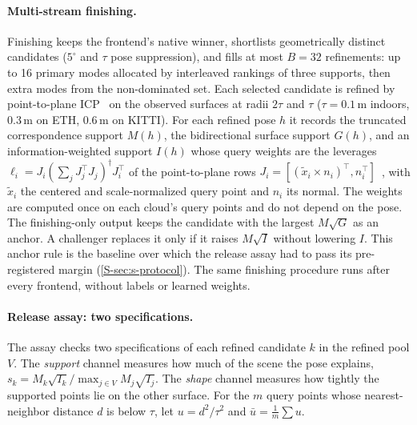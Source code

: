 \paragraph{Multi-stream finishing.} Finishing keeps the frontend's native winner, shortlists geometrically distinct candidates ($5^\circ$ and $\tau$ pose suppression), and fills at most $B=32$ refinements: up to 16 primary modes allocated by interleaved rankings of three supports, then extra modes from the non-dominated set. Each selected candidate is refined by point-to-plane ICP~\cite{besl1992icp,chen1992medioni} on the observed surfaces at radii $2\tau$ and $\tau$ ($\tau=0.1$\,m indoors, 0.3\,m on ETH, 0.6\,m on KITTI). For each refined pose $h$ it records the truncated correspondence support $M(h)$, the bidirectional surface support $G(h)$, and an information-weighted support $I(h)$ whose query weights are the leverages $\ell_i=J_i(\sum_jJ_j^\top J_j)^{\dagger}J_i^\top$ of the point-to-plane rows $J_i=[(\widetilde x_i\times n_i)^\top,n_i^\top]$~\cite{gelfand2003stable}, with $\widetilde x_i$ the centered and scale-normalized query point and $n_i$ its normal. The weights are computed once on each cloud's query points and do not depend on the pose. The finishing-only output keeps the candidate with the largest $M\sqrt{G}$ as an anchor. A challenger replaces it only if it raises $M\sqrt{I}$ without lowering $I$. This anchor rule is the baseline over which the release assay had to pass its pre-registered margin (\cref{S-sec:s-protocol}). The same finishing procedure runs after every frontend, without labels or learned weights.

\paragraph{Release assay: two specifications.} The assay checks two specifications of each refined candidate $k$ in the refined pool $V$. The \emph{support} channel measures how much of the scene the pose explains, $s_k=M_k\sqrt{I_k}/\max_{j\in V}M_j\sqrt{I_j}$. The \emph{shape} channel measures how tightly the supported points lie on the other surface. For the $m$ query points whose nearest-neighbor distance $d$ is below $\tau$, let $u=d^2/\tau^2$ and $\bar u=\frac1m\sum u$.

